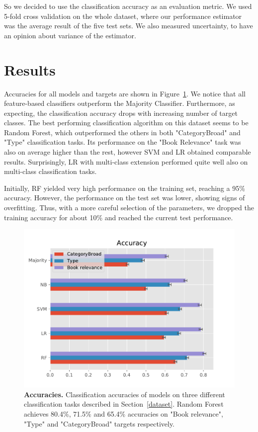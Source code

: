 \documentclass[11pt,a4paper]{article}
\begin{document}
So we decided to use the classification accuracy as an evaluation metric. We used 5-fold cross validation on the whole dataset, where our performance estimator was the average result of the five test sets. We also measured uncertainty, to have an opinion about variance of the estimator.

\section{Results}
Accuracies for all models and targets are shown in Figure~\ref{fig:acc_res}. We notice that all feature-based classifiers outperform the Majority Classifier. Furthermore, as expecting, the classification accuracy drops with increasing number of target classes. The best performing classification algorithm on this dataset seems to be Random Forest, which outperformed the others in both "CategoryBroad" and "Type" classification tasks. Its performance on the "Book Relevance" task was also on average higher than the rest, however SVM and LR obtained comparable results. Surprisingly, LR with multi-class extension performed quite well also on multi-class classification tasks.

Initially, RF yielded very high performance on the training set, reaching a 95\% accuracy. However, the performance on the test set was lower, showing signs of overfitting. Thus, with a more careful selection of the parameters, we dropped the training accuracy for about 10\% and reached the current test performance.

\begin{figure}[tbh]
    \centering
    \includegraphics[width = \linewidth]{../results/Accuracy_plot.pdf}
    \caption{\textbf{Accuracies.} Classification accuracies of models on three different classification tasks described in Section~\ref{dataset}. Random Forest achieves 80.4\%, 71.5\% and 65.4\% accuracies on "Book relevance", "Type" and "CategoryBroad" targets respectively.}
    \label{fig:acc_res}
\end{figure}
\end{document}
